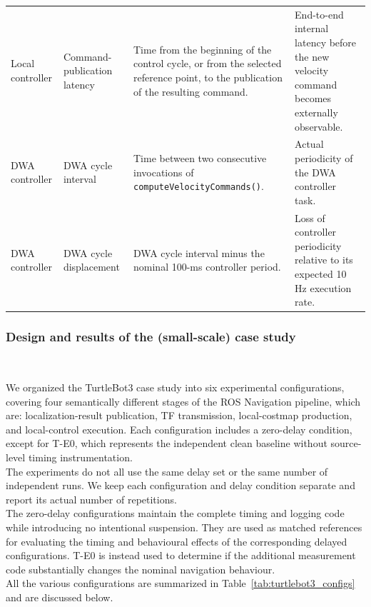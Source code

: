 \begin{table}[t]
\begin{tabular}{p{} p{}
                p{} p{}}
Local controller &
Command-publication latency &
Time from the beginning of the control cycle, or from the selected reference point, to the publication of the resulting command. &
End-to-end internal latency before the new velocity command becomes externally observable. \\

DWA controller &
DWA cycle interval &
Time between two consecutive invocations of \texttt{computeVelocityCommands()}. &
Actual periodicity of the DWA controller task. \\

DWA controller &
DWA cycle displacement &
DWA cycle interval minus the nominal 100-ms controller period. &
Loss of controller periodicity relative to its expected 10 Hz execution rate. \\

\hline
\end{tabular}
\end{table}

\subsubsection{Design and results of the (small-scale) case study}
\\
\leavevmode\par
\noindent We organized the TurtleBot3 case study into six experimental configurations, covering four semantically different stages of the ROS Navigation pipeline, which are: localization-result publication, TF transmission, local-costmap production, and local-control execution. Each configuration includes a zero-delay condition, except for T-E0, which represents the independent clean baseline without source-level timing instrumentation.
\\
The experiments do not all use the same delay set or the same number of independent runs. We keep each configuration and delay condition separate and report its actual number of repetitions. 
\\
The zero-delay configurations maintain the complete timing and logging code while introducing no intentional suspension. They are used as matched references for evaluating the timing and behavioural effects of the corresponding delayed configurations. T-E0 is instead used to determine if the additional measurement code substantially changes the nominal navigation behaviour.
\\
All the various configurations are summarized in Table~\ref{tab:turtlebot3_configs} and are discussed below.

